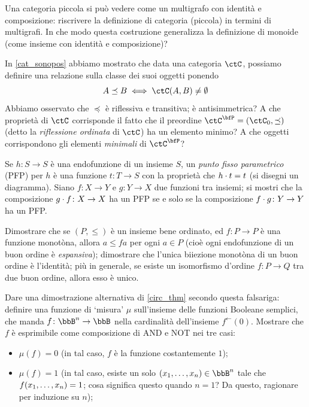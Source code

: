 \begin{esercizi}
 \item Una categoria piccola si può vedere come un multigrafo con identità e composizione: riscrivere la definizione di categoria (piccola) in termini di multigrafi.  In che modo questa costruzione generalizza la definizione di monoide (come insieme con identità e composizione)?
 \item In \ref{cat_sonopos} abbiamo mostrato che data una categoria \(\ctC\), possiamo definire una relazione sulla classe dei suoi oggetti ponendo
 \[A\preceq B \iff \Hom{\ctC}(A,B)\ne\emptyset\]
 Abbiamo osservato che \(\preceq\) è riflessiva e transitiva; è antisimmetrica? A che proprietà di \(\ctC\) corrisponde il fatto che il preordine \(\ctC^\bfP=(\ctC_0,\preceq)\) (detto la \emph{riflessione ordinata} di \(\ctC\)) ha un elemento minimo? A che oggetti corrispondono gli elementi \emph{minimali} di \(\ctC^\bfP\)?
 \item Se \(h \colon S\to S\) è una endofunzione di un insieme \(S\), un \emph{punto fisso parametrico} (PFP) per \(h\) è una funzione \(t \colon T\to S\) con la proprietà che \(h\cdot t = t\) (si disegni un diagramma). Siano \(f \colon X\to Y\) e \(g \colon Y \to X\) due funzioni tra insiemi; si mostri che la composizione \(g\cdot f \colon X\to X\) ha un PFP se e solo se la composizione \(f\cdot g \colon Y\to Y\) ha un PFP.
 \item Dimostrare che se \((P,\le)\) è un insieme bene ordinato, ed \(f \colon P\to P\) è una funzione monotòna, allora \(a\le fa\) per ogni \(a\in P\) (cioè ogni endofunzione di un buon ordine è \emph{espansiva}); dimostrare che l'unica biiezione monotòna di un buon ordine è l'identità; più in generale, se esiste un isomorfismo d'ordine \(f \colon P\to Q\) tra due buon ordine, allora esso è unico.
 \item Dare una dimostrazione alternativa di \ref{circ_thm} secondo questa falsariga: definire una funzione di `misura' \(\mu\) sull'insieme delle funzioni Booleane semplici, che manda \(f \colon \bbB^n\to\bbB\) nella cardinalità dell'insieme \(f^\leftarrow(0)\). Mostrare che \(f\) è esprimibile come composizione di AND e NOT nei tre casi:
 \begin{itemize}
  \item \(\mu(f)=0\) (in tal caso, \(f\) è la funzione costantemente \(1\));
  \item \(\mu(f)=1\) (in tal caso, esiste un solo \((\tup xn,)\in \bbB^n\) tale che \(f(\tup xn,)=1\); cosa significa questo quando \(n=1\)? Da questo, ragionare per induzione su \(n\));

\end{itemize}
\end{esercizi}
